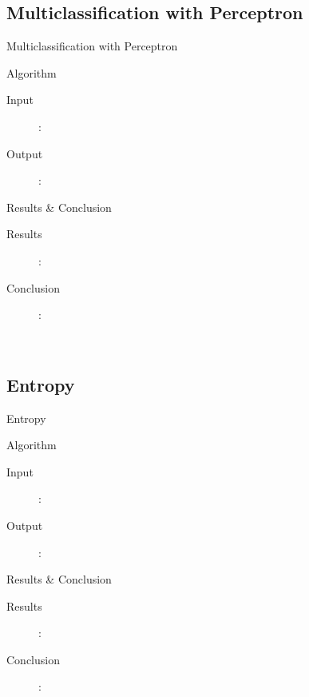 \documentclass{beamer}
\begin{document}
\subsection{Multiclassification with Perceptron}
\begin{frame}{Multiclassification with Perceptron}
\begin{block}{Algorithm}
\end{block}
\begin{description}
\item[Input]: 
\item[Output]:
\end{description}
\end{frame}
\begin{frame}{Results \& Conclusion}
\begin{description}
\item[Results]: 
\item[Conclusion]:
\end{description}
\end{frame}
\
\subsection{Entropy}
\begin{frame}{Entropy}
\begin{block}{Algorithm}
\end{block}
\begin{description}
\item[Input]: 
\item[Output]:
\end{description}
\end{frame}
\begin{frame}{Results \& Conclusion}
\begin{description}
\item[Results]: 
\item[Conclusion]:
\end{description}
\end{frame}

\end{document}

